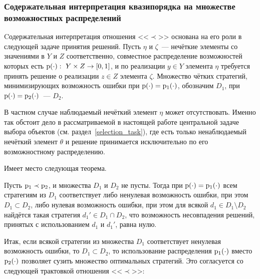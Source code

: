\subsubsection{Содержательная интерпретация квазипорядка на множестве возможностных распределений}
\label{preorder_explain}

Cодержательная интерпретация отношения <<$\prec$>> основана на его роли в следующей задаче принятия решений.  Пусть $\eta$ и $\zeta$~--- нечёткие элементы со значениями в $Y$ и $Z$ соответственно, совместное распределение возможностей которых есть ${\mathrm{p}}(\cdot):\ Y\times Z\to[0,1]$, и по реализации $y\in Y$ элемента $\eta$ требуется принять решение о реализации $z\in Z$ элемента $\zeta$. Множество чётких стратегий, минимизирующих возможность ошибки при ${\mathrm{p}}(\cdot) = {\mathrm{p}}_1(\cdot)$, обозначим $D_1$, при ${\mathrm{p}}(\cdot) = {\mathrm{p}}_2(\cdot)$~--- $D_2$.
\begin{notice}
В частном случае наблюдаемый нечёткий элемент $\eta$ может отсутствовать. Именно так обстоит дело в рассматриваемой в настоящей работе центральной задаче выбора объектов (см. раздел~\ref{selection_task}), где есть только ненаблюдаемый нечёткий элемент $\theta$ и решение принимается исключительно по его возможностному распределению.
\end{notice}
Имеет место следующая теорема.

\begin{theorem}
\label{theorem_zubyuk}
    Пусть ${\mathrm{p}}_1\prec{\mathrm{p}}_2$, и множества $D_1$ и $D_2$ не пусты. Тогда при ${\mathrm{p}}(\cdot) = {\mathrm{p}}_1(\cdot)$ всем стратегиям из $D_1$ соответствует либо ненулевая возможность ошибки, при этом $D_1\subset D_2$, либо нулевая возможность ошибки, при этом для всякой $d_1\in D_1\setminus D_2$ найдётся такая стратегия $d_1'\in  D_1\cap D_2$, что возможность несовпадения решений, принятых с использованием $d_1$ и $d_1'$, равна нулю.
\end{theorem}

Итак, если всякой стратегии из множества $D_1$ соответствует ненулевая возможность ошибки, то $D_1\subset D_2$, то  использование распределения ${\mathrm{p}}_1(\cdot)$ вместо ${\mathrm{p}}_2(\cdot)$ позволяет сузить множество оптимальных стратегий. 
Это согласуется со следующей трактовкой отношения <<$\prec$>>: 
\begin{center}  \end{center}

